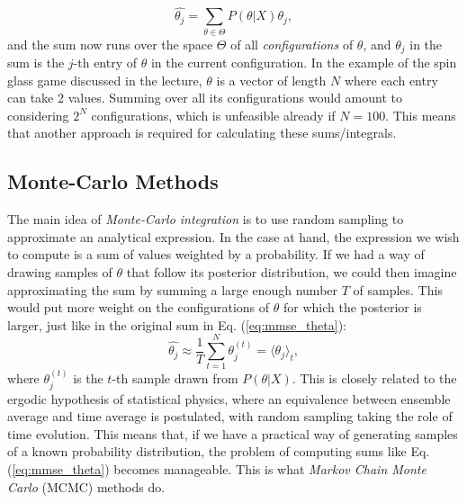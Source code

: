 \documentclass{article}
\begin{document}
\begin{equation}
    \hat{\theta_j}
    =
    \sum_{\theta \in \Theta} P(\theta | X)\theta_j,
    \label{eq:mmse_theta}
\end{equation}
and the sum now runs over the space $\Theta$ of all \emph{configurations} of $\theta$, and $\theta_j$ in the sum is the $j$-th entry of $\theta$ in the current configuration. In the example of the spin glass game discussed in the lecture, $\theta$ is a vector of length $N$ where each entry can take 2 values. Summing over all its configurations would amount to considering $2^N$ configurations, which is unfeasible already if $N=100$. This means that another approach is required for calculating these sums/integrals.

\subsection{Monte-Carlo Methods}
The main idea of \emph{Monte-Carlo integration} is to use random sampling to approximate an analytical expression. In the case at hand, the expression we wish to compute is a sum of values weighted by a probability. If we had a way of drawing samples of $\theta$ that follow its posterior distribution, we could then imagine approximating the sum by summing a large enough number $T$ of samples. This would put more weight on the configurations of $\theta$ for which the posterior is larger, just like in the original sum in Eq. (\ref{eq:mmse_theta}):
\begin{equation}
    \hat{\theta_j}
    \approx
    \frac{1}{T}
    \sum_{t=1}^{N} \theta_j^{(t)}
    =
    \langle \theta_j \rangle_t,
\end{equation}
where $\theta_j^{(t)}$ is the $t$-th sample drawn from $P(\theta | X)$. This is closely related to the ergodic hypothesis of statistical physics, where an equivalence between ensemble average and time average is postulated, with random sampling taking the role of time evolution. This means that, if we have a practical way of generating samples of a known probability distribution, the problem of computing sums like Eq. (\ref{eq:mmse_theta}) becomes manageable. This is what \emph{Markov Chain Monte Carlo} (MCMC) methods do.
\end{document}
